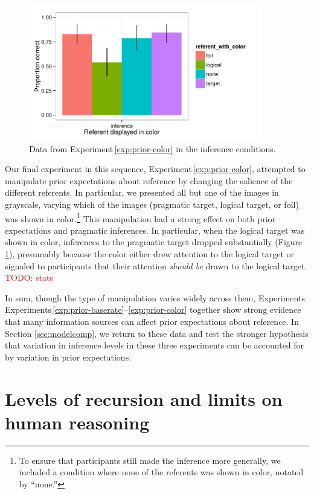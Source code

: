 \documentclass[man,noapacite]{apa2}
\newcommand{\red}[1]{\textcolor{red}{#1}}
\newcounter{Experiment}
\newcommand{\exptref}[1]{Experiment\,\ref{#1}}
\newcommand{\exptrefrange}[2]{Experiments\,\ref{#1}--\ref{#2}}
\begin{document}
\begin{figure}[t]
  \centering
  \includegraphics[width=4in]{../plots/2-prior-color.pdf}
  \caption{\label{fig:prior-color} Data from \exptref{exp:prior-color} in the inference conditions.}
\end{figure}

Our final experiment in this sequence, \exptref{exp:prior-color}, attempted to manipulate prior expectations about reference by changing the salience of the different referents. In particular, we presented all but one of the images in grayscale, varying which of the images (pragmatic target, logical target, or foil) was shown in color.\footnote{To ensure that participants still made the inference more generally, we included a condition where none of the referents was shown in color, notated by ``none.''} This manipulation had a strong effect on both prior expectations and pragmatic inferences. In particular, when the logical target was shown in color, inferences to the pragmatic target dropped substantially (Figure \ref{fig:prior-color}), presumably because the color either drew attention to the logical target or signaled to participants that their attention \emph{should be} drawn to the logical target. \red{TODO: stats}

In sum, though the type of manipulation varies widely across them, Experiments \exptrefrange{exp:prior-baserate}{exp:prior-color} together show strong evidence that many information sources can affect prior expectations about reference. In Section \ref{sec:modelcomp}, we return to these data and test the stronger hypothesis that variation in inference levels in these three experiments can be accounted for by variation in prior expectations.


\section{Levels of recursion and limits on human reasoning}
\label{sec:levels}
\end{document}
